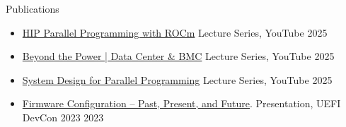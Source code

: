 \documentclass{resume} %
\begin{document}
\begin{rSection}{Publications}

\begin{itemize}
    \item \href{https://youtube.com/playlist?list=PLWyBQeJgIuzDFELUK9ineNkOr9LuYatkR&si=mUVeIkLFK5gzyZa7}{HIP Parallel Programming with ROCm} Lecture Series, YouTube  \hfill {2025}
    \item \href{https://youtube.com/playlist?list=PLWyBQeJgIuzC6oN8AihmSMkgheX9TLDaW&si=HAOmHXKP4KdsAzPX}{Beyond the Power | Data Center \& BMC} Lecture Series, YouTube  \hfill {2025}
    \item \href{https://www.youtube.com/playlist?list=PLWyBQeJgIuzD2o9ZVw5oI-P2fX4uyNKZA}{System Design for Parallel Programming} Lecture Series, YouTube  \hfill {2025}
    \item \href{https://uefi.org/sites/default/files/resources/Firmware%20Configuration%20%E2%80%93%20Past%2C%20Present%2C%20and%20Future_Zimmer.pdf}{Firmware Configuration – Past, Present, and Future}. Presentation, UEFI DevCon 2023 \hfill {2023}
\end{itemize}


\end{rSection}
\end{document}
